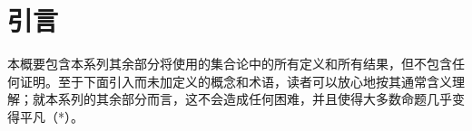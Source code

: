 \section*{引言}
{}
\setcounter{section}{0}

本概要包含本系列其余部分将使用的集合论中的所有定义和所有结果，但不包含任何证明。至于下面引入而未加定义的概念和术语，读者可以放心地按其通常含义理解；就本系列的其余部分而言，这不会造成任何困难，并且使得大多数命题几乎变得平凡（*）。

